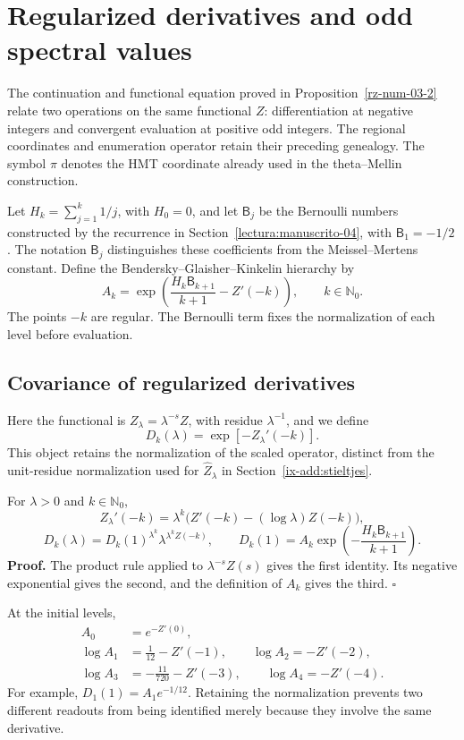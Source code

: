 \section{Regularized derivatives and odd spectral values}
\label{ix-add:bendersky}

The continuation and functional equation proved in
Proposition~\ref{rz-num-03-2} relate two operations on the same
functional $Z$: differentiation at negative integers and convergent
evaluation at positive odd integers. The regional coordinates and
enumeration operator retain their preceding genealogy. The symbol
$\pi$ denotes the HMT coordinate already used in the theta--Mellin
construction.

Let $H_k=\sum_{j=1}^k1/j$, with $H_0=0$, and let $\mathsf B_j$
be the Bernoulli numbers constructed by the recurrence in
Section~\ref{lectura:manuscrito-04}, with $\mathsf B_1=-1/2$.
The notation $\mathsf B_j$ distinguishes these coefficients from the
Meissel--Mertens constant. Define the Bendersky--Glaisher--Kinkelin
hierarchy by
\[
 A_k=\exp\!\left(\frac{H_k\mathsf B_{k+1}}{k+1}-Z'(-k)\right),
 \qquad k\in\mathbb N_0.
\]
The points $-k$ are regular. The Bernoulli term fixes the normalization
of each level before evaluation.

\subsection{Covariance of regularized derivatives}
Here the functional is $Z_\lambda=\lambda^{-s}Z$, with residue
$\lambda^{-1}$, and we define
\[
 D_k(\lambda)=\exp[-Z_\lambda'(-k)].
\]
This object retains the normalization of the scaled operator, distinct
from the unit-residue normalization used for $\widehat Z_\lambda$
in Section~\ref{ix-add:stieltjes}.

For $\lambda>0$ and $k\in\mathbb N_0$,
\[
 Z_\lambda'(-k)=\lambda^k
       \bigl(Z'(-k)-(\log\lambda)Z(-k)\bigr),
\]
\[
 D_k(\lambda)=D_k(1)^{\lambda^k}
               \lambda^{\lambda^k Z(-k)},\qquad
 D_k(1)=A_k\exp\!\left(-\frac{H_k\mathsf B_{k+1}}{k+1}\right).
\]
\textbf{Proof.} The product rule applied to $\lambda^{-s}Z(s)$ gives
the first identity. Its negative exponential gives the second, and
the definition of $A_k$ gives the third. \hfill$\square$

At the initial levels,
\[
\begin{aligned}
 A_0&=e^{-Z'(0)},\\
 \log A_1&=\frac1{12}-Z'(-1),\qquad \log A_2=-Z'(-2),\\
 \log A_3&=-\frac{11}{720}-Z'(-3),\qquad \log A_4=-Z'(-4).
\end{aligned}
\]
For example, $D_1(1)=A_1e^{-1/12}$. Retaining the normalization
prevents two different readouts from being identified merely because
they involve the same derivative.

